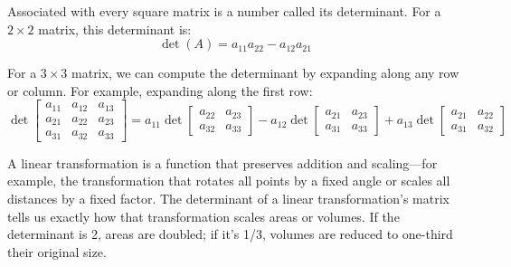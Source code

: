 \noindent Associated with every square matrix is a number called its determinant. For a $2 \times 2$ matrix, this determinant is:
\[
\det(A) = a_{11}a_{22} - a_{12}a_{21}
\]

\noindent For a $3 \times 3$ matrix, we can compute the determinant by expanding along any row or column. For example, expanding along the first row:
\[
\det\begin{bmatrix}
a_{11} & a_{12} & a_{13} \\
a_{21} & a_{22} & a_{23} \\
a_{31} & a_{32} & a_{33}
\end{bmatrix} = a_{11}\det\begin{bmatrix}
a_{22} & a_{23} \\
a_{32} & a_{33}
\end{bmatrix} - a_{12}\det\begin{bmatrix}
a_{21} & a_{23} \\
a_{31} & a_{33}
\end{bmatrix} + a_{13}\det\begin{bmatrix}
a_{21} & a_{22} \\
a_{31} & a_{32}
\end{bmatrix}
\]

\noindent A linear transformation is a function that preserves addition and scaling—for example, the transformation that rotates all points by a fixed angle or scales all distances by a fixed factor. The determinant of a linear transformation's matrix tells us exactly how that transformation scales areas or volumes. If the determinant is 2, areas are doubled; if it's 1/3, volumes are reduced to one-third their original size.

